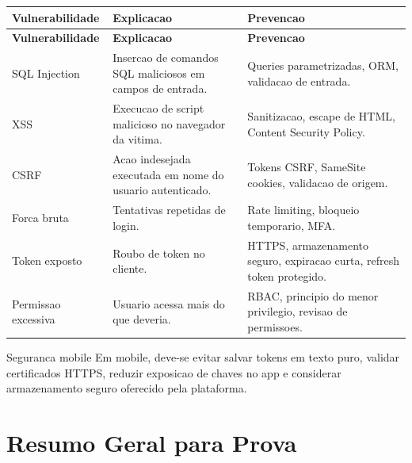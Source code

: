 \documentclass[12pt,a4paper]{article}
\begin{document}
\begin{longtable}{@{}L{3.2cm}L{5.7cm}L{5.7cm}@{}}
\toprule
\textbf{Vulnerabilidade} & \textbf{Explicacao} & \textbf{Prevencao} \\
\midrule
\endfirsthead
\toprule
\textbf{Vulnerabilidade} & \textbf{Explicacao} & \textbf{Prevencao} \\
\midrule
\endhead
SQL Injection & Insercao de comandos SQL maliciosos em campos de entrada. & Queries parametrizadas, ORM, validacao de entrada. \\
XSS & Execucao de script malicioso no navegador da vitima. & Sanitizacao, escape de HTML, Content Security Policy. \\
CSRF & Acao indesejada executada em nome do usuario autenticado. & Tokens CSRF, SameSite cookies, validacao de origem. \\
Forca bruta & Tentativas repetidas de login. & Rate limiting, bloqueio temporario, MFA. \\
Token exposto & Roubo de token no cliente. & HTTPS, armazenamento seguro, expiracao curta, refresh token protegido. \\
Permissao excessiva & Usuario acessa mais do que deveria. & RBAC, principio do menor privilegio, revisao de permissoes. \\
\bottomrule
\end{longtable}

\begin{observacao}{Seguranca mobile}
Em mobile, deve-se evitar salvar tokens em texto puro, validar certificados HTTPS, reduzir exposicao de chaves no app e considerar armazenamento seguro oferecido pela plataforma.
\end{observacao}

\section{Resumo Geral para Prova}
\end{document}
